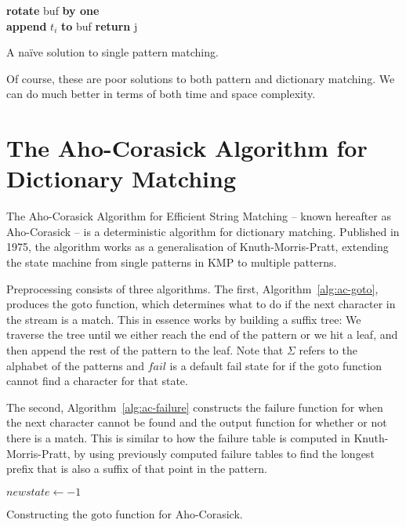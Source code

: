 \documentclass[ %
                    author={Dominic Joseph Moylett},
                supervisor={Dr. Raphael Clifford and Dr. Benjamin Sach},
                    degree={MEng},
                     title={Dictionary Matching with Fingerprints},
                  subtitle={An Empirical Analysis},
                      type={Research},
                      year={2014} ]{dissertation}
\begin{document}
\begin{algorithm}[t]
{\bf rotate} buf {\bf by one}\\
{\bf append} $t_i$ {\bf to} buf
{\bf return} j
\caption{A na\"{i}ve solution to single pattern matching.}
\label{alg:naive-pattern}
\end{algorithm}

Of course, these are poor solutions to both pattern and dictionary matching. We can do much better in terms of both time and space complexity.

\section{The Aho-Corasick Algorithm for Dictionary Matching}

\noindent
The Aho-Corasick Algorithm for Efficient String Matching\cite{Aho:1975:ESM:360825.360855} -- known hereafter as Aho-Corasick -- is a deterministic algorithm for dictionary matching. Published in 1975, the algorithm works as a generalisation of Knuth-Morris-Pratt, extending the state machine from single patterns in KMP to multiple patterns.

Preprocessing consists of three algorithms. The first, Algorithm~\ref{alg:ac-goto}, produces the $\text{goto}$ function, which determines what to do if the next character in the stream is a match. This in essence works by building a suffix tree: We traverse the tree until we either reach the end of the pattern or we hit a leaf, and then append the rest of the pattern to the leaf. Note that $\Sigma$ refers to the alphabet of the patterns and $fail$ is a default fail state for if the $\text{goto}$ function cannot find a character for that state.

The second, Algorithm~\ref{alg:ac-failure} constructs the $\text{failure}$ function for when the next character cannot be found and the $\text{output}$ function for whether or not there is a match. This is similar to how the failure table is computed in Knuth-Morris-Pratt, by using previously computed failure tables to find the longest prefix that is also a suffix of that point in the pattern.

\begin{algorithm}[t]
$newstate \gets -1$\\
\caption{Constructing the $\text{goto}$ function for Aho-Corasick.}
\label{alg:ac-goto}
\end{algorithm}
\end{document}

